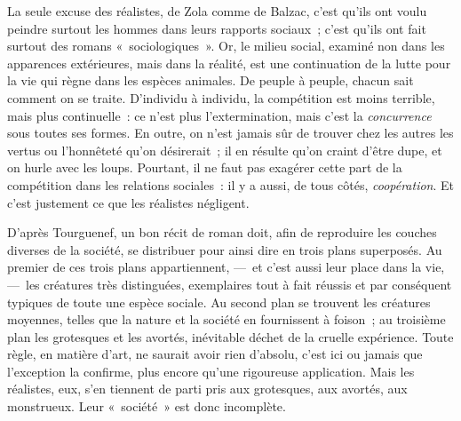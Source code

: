 \documentclass[french,twoside]{book} %
\begin{document}
La seule excuse des réalistes, de Zola comme de Balzac, c’est qu’ils ont voulu peindre surtout les hommes dans leurs rapports sociaux ; c’est qu’ils ont fait surtout des romans « sociologiques ». Or, le milieu social, examiné non dans les apparences extérieures, mais dans la réalité, est une continuation de la lutte pour la vie qui règne dans les espèces animales. De peuple à peuple, chacun sait comment on se traite. D’individu à individu, la compétition est moins terrible, mais plus continuelle : ce n’est plus l’extermination, mais c’est la \emph{concurrence} sous toutes ses formes. En outre, on n’est jamais sûr de trouver chez les autres les vertus ou l’honnêteté qu’on désirerait ; il en résulte qu’on craint d’être dupe, et on hurle avec les loups. Pourtant, il ne faut pas exagérer cette part de la compétition dans les relations sociales : il y a aussi, de tous côtés, \emph{coopération}. Et c’est justement ce que les réalistes négligent.\par
D’après Tourguenef, un bon récit de roman doit, afin de reproduire les couches diverses de la société, se distribuer pour ainsi dire en trois plans superposés. Au premier de ces trois plans appartiennent, — et c’est aussi leur place dans la vie, — les créatures très distinguées, exemplaires tout à fait réussis et par conséquent typiques de toute une espèce sociale. Au second plan se trouvent les créatures moyennes, telles que la nature et la société en fournissent à foison ; au troisième plan les grotesques et les avortés, inévitable déchet de la cruelle expérience. Toute règle, en matière d’art, ne saurait avoir rien d’absolu, c’est ici ou jamais que l’exception la confirme, plus encore qu’une rigoureuse application. Mais les réalistes, eux, s’en tiennent de parti pris aux grotesques, aux avortés, aux monstrueux. Leur « société » est donc incomplète.\par
\end{document}

